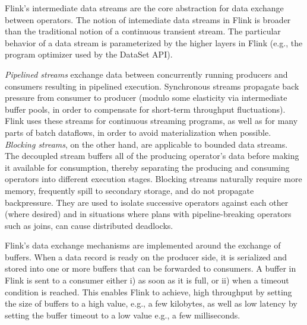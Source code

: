 Flink's intermediate data streams are the core abstraction for data exchange between operators. The notion of intemediate data streams in Flink is broader than the traditional notion of a continuous transient stream. The particular behavior of a data stream is parameterized by the higher layers in Flink (e.g., the program optimizer used by the DataSet API). 


 \emph{Pipelined streams} exchange data between concurrently running producers and consumers resulting in pipelined execution. Synchronous streams propagate back pressure from consumer to producer (modulo some elasticity via intermediate buffer pools, in order to compensate for short-term throughput fluctuations). Flink uses these streams for continuous streaming programs, as well as for many parts of batch dataflows, in order to avoid materialization when possible. \emph{Blocking streams}, on the other hand, are applicable to bounded data streams. The decoupled stream buffers all of the producing operator's data before making it available for consumption, thereby separating the producing and consuming operators into different execution stages. Blocking streams naturally require more memory, frequently spill to secondary storage, and do not propagate backpressure. They are used to isolate successive operators against each other (where desired) and in situations where plans with pipeline-breaking operators such as joins, can cause distributed deadlocks.

 Flink’s data exchange mechanisms are implemented around the exchange of buffers. When a data record is ready on the producer side, it is serialized and stored into one or more buffers that can be forwarded to consumers. A buffer in Flink is sent to a consumer either i) as soon as it is full, or ii) when a timeout condition is reached. This enables Flink to achieve, high throughput by setting the size of buffers to a high value, e.g., a few kilobytes, as well as low latency by setting the buffer timeout to a low value e.g., a few milliseconds.

